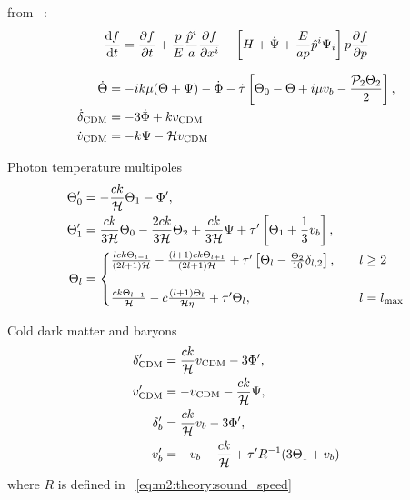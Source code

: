     from ~\cite[Eq. 3.76]{dodelson2020modern}:
    \begin{equation}\label{eq:m3:theory:boltzmann_for_massive_particles}
        \dv{f}{t} = \pdv{f}{t}+\frac{p}{E}\frac{\hat{p}^i}{a}\pdv{f}{x^i} - \left[H+\dot{\Psi}+\frac{E}{ap}\hat{p}^i\Psi_i\right]p\pdv{f}{p}
    \end{equation}


     

    \begin{subequations}
        \begin{align}
            \dot{\Theta} &= -ik\mu(\Theta+\Psi)-\dot{\Phi}-\dot{\tau}\left[\Theta_0-\Theta+i\mu v_b-\frac{\mathcal{P}_2\Theta_2}{2}\right],\\
            \dot{\delta}_{\text{CDM}} &= -3\dot{\Phi}+kv_{\text{CDM}} \\
            \dot{v}_{\text{CDM}} &= -k\Psi-\mathcal{H} v_{\text{CDM}} \\
        \end{align}
    \end{subequations}

    
    Photon temperature multipoles
    \begin{subequations}\label{eq:m3:theory:photon_temp_multipoles}
        \begin{align}
            \Theta_0' &= -\frac{ck}{\mathcal{H}}\Theta_1-\Phi',\label{eq:m3:theory:photon_monopole}\\
            \Theta_1' &= \frac{ck}{3\mathcal{H}}\Theta_0 - \frac{2ck}{3\mathcal{H}}\Theta_2 +\frac{ck}{3\mathcal{H}}\Psi+\tau'\left[\Theta_1+\frac{1}{3}v_b\right],\label{eq:m3:theory:photon_dipole}\\
            \Theta_l &= \begin{cases}
                \frac{lck\Theta_{l-1}}{(2l+1)\mathcal{H}} -\frac{(l+1)ck\Theta_{l+1}}{(2l+1)\mathcal{H}} +\tau'\left[\Theta_l-\frac{\Theta_2}{10}\delta_{l,2}\right] , \quad &l\geq2\\
                \\
                \frac{ck\Theta_{l-1}}{\mathcal{H}} - c\frac{(l+1)\Theta_l}{\mathcal{H}\eta}+\tau'\Theta_l, &l=l_\mathrm{max}
            \end{cases}\label{eq:m3:theory:photon_multipole}
        \end{align}
    \end{subequations}


    
    Cold dark matter and baryons
    \begin{subequations}\label{eq:m3:theory:cdm_baryon_diffeqs}
        \begin{align}
            \delta'_{\text{CDM}} &= \frac{ck}{\mathcal{H}}v_{\text{CDM}}-3\Phi', \label{eq:m3:theory:delta_cdm}\\
            v'_{\text{CDM}} &= -v_{\text{CDM}}-\frac{ck}{\mathcal{H}}\Psi, \label{eq:m3:theory:v_cdm}\\
            \delta'_b &= \frac{ck}{\mathcal{H}}v_b - 3\Phi', \label{eq:m3:theory:delta_b}\\
            v'_b &= -v_b - \frac{ck}{\mathcal{H}} + \tau'R^{-1}(3\Theta_1+v_b) \label{eq:m3:theory:v_b}
        \end{align}
    \end{subequations}
    where $R$ is defined in ~\cref{eq:m2:theory:sound_speed}



